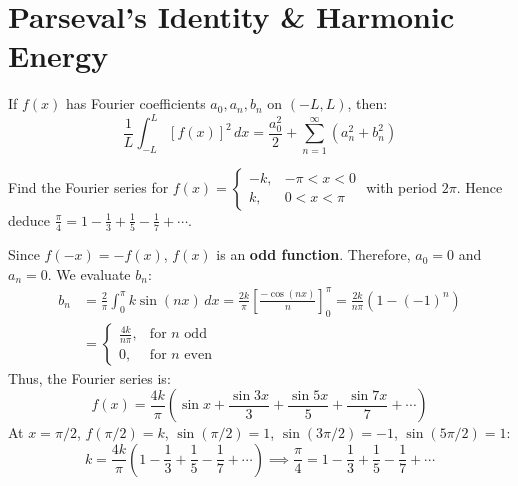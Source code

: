 \section{Parseval's Identity \& Harmonic Energy}

\begin{theorem}
If $f(x)$ has Fourier coefficients $a_0, a_n, b_n$ on $(-L, L)$, then:
\begin{equation}
\frac{1}{L} \int_{-L}^L [f(x)]^2\,dx = \frac{a_0^2}{2} + \sum_{n=1}^\infty (a_n^2 + b_n^2)
\end{equation}
\end{theorem}

\begin{example}
Find the Fourier series for $f(x) = \begin{cases} -k, & -\pi < x < 0 \\ k, & 0 < x < \pi \end{cases}$ with period $2\pi$. Hence deduce $\frac{\pi}{4} = 1 - \frac{1}{3} + \frac{1}{5} - \frac{1}{7} + \cdots$.
\end{example}

\begin{solutionbox}
Since $f(-x) = -f(x)$, $f(x)$ is an \textbf{odd function}.
Therefore, $a_0 = 0$ and $a_n = 0$.
We evaluate $b_n$:
\begin{align}
b_n &= \frac{2}{\pi}\int_0^\pi k \sin(nx)\,dx = \frac{2k}{\pi} \left[ \frac{-\cos(nx)}{n} \right]_0^\pi = \frac{2k}{n\pi}(1 - (-1)^n) \\
&= \begin{cases}
\frac{4k}{n\pi}, & \text{for } n \text{ odd} \\
0, & \text{for } n \text{ even}
\end{cases}
\end{align}
Thus, the Fourier series is:
\begin{equation}
f(x) = \frac{4k}{\pi} \left( \sin x + \frac{\sin 3x}{3} + \frac{\sin 5x}{5} + \frac{\sin 7x}{7} + \cdots \right)
\end{equation}
At $x = \pi/2$, $f(\pi/2) = k$, $\sin(\pi/2) = 1$, $\sin(3\pi/2) = -1$, $\sin(5\pi/2) = 1$:
\begin{equation}
k = \frac{4k}{\pi} \left( 1 - \frac{1}{3} + \frac{1}{5} - \frac{1}{7} + \cdots \right) \implies \frac{\pi}{4} = 1 - \frac{1}{3} + \frac{1}{5} - \frac{1}{7} + \cdots
\end{equation}
\end{solutionbox}

